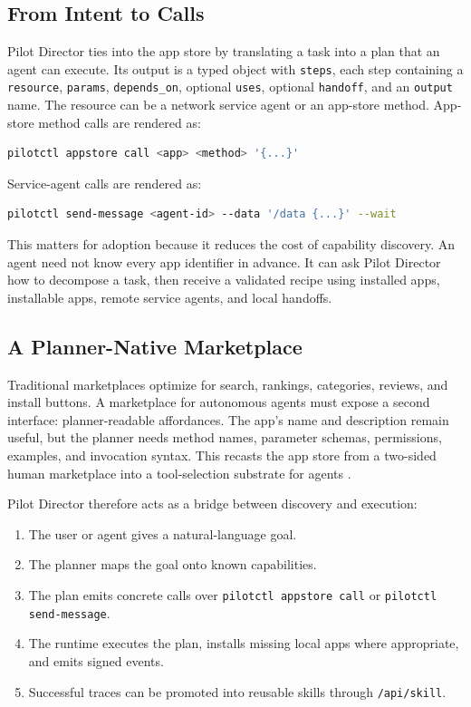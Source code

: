 \documentclass[10pt,twocolumn]{article}
\newcommand{\director}{Pilot Director}
\begin{document}
\subsection{From Intent to Calls}

\director{} ties into the app store by translating a task into a plan that an agent can execute. Its output is a typed object with \texttt{steps}, each step containing a \texttt{resource}, \texttt{params}, \texttt{depends\_on}, optional \texttt{uses}, optional \texttt{handoff}, and an \texttt{output} name. The resource can be a network service agent or an app-store method. App-store method calls are rendered as:

\begin{lstlisting}[language=bash]
pilotctl appstore call <app> <method> '{...}'
\end{lstlisting}

Service-agent calls are rendered as:

\begin{lstlisting}[language=bash]
pilotctl send-message <agent-id> --data '/data {...}' --wait
\end{lstlisting}

This matters for adoption because it reduces the cost of capability discovery. An agent need not know every app identifier in advance. It can ask \director{} how to decompose a task, then receive a validated recipe using installed apps, installable apps, remote service agents, and local handoffs.

\subsection{A Planner-Native Marketplace}

Traditional marketplaces optimize for search, rankings, categories, reviews, and install buttons. A marketplace for autonomous agents must expose a second interface: planner-readable affordances. The app's name and description remain useful, but the planner needs method names, parameter schemas, permissions, examples, and invocation syntax. This recasts the app store from a two-sided human marketplace into a tool-selection substrate for agents \cite{rochetTirole2003,jansen2013appstores,qin2023toollm,mcp2025spec}.

\director{} therefore acts as a bridge between discovery and execution:
\begin{enumerate}
    \item The user or agent gives a natural-language goal.
    \item The planner maps the goal onto known capabilities.
    \item The plan emits concrete calls over \texttt{pilotctl appstore call} or \texttt{pilotctl send-message}.
    \item The runtime executes the plan, installs missing local apps where appropriate, and emits signed events.
    \item Successful traces can be promoted into reusable skills through \texttt{/api/skill}.
\end{enumerate}
\end{document}
